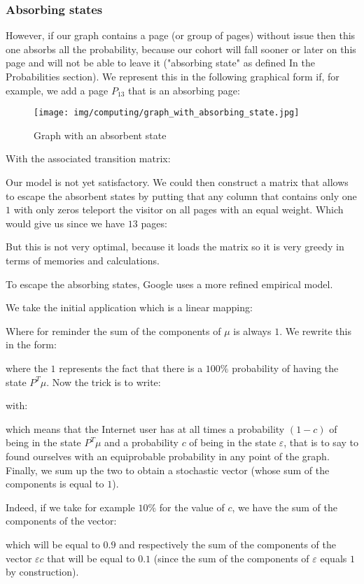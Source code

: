 	\subsubsection{Absorbing states}
	However, if our graph contains a page (or group of pages) without issue then this one absorbs all the probability, because our cohort will fall sooner or later on this page and will not be able to leave it ("absorbing state" as defined In the Probabilities section). We represent this in the following graphical form if, for example, we add a page $P_{13}$ that is an absorbing page:
	\begin{figure}[H]
		\centering
		\texttt{[image: img/computing/graph\_with\_absorbing\_state.jpg]}
		\caption{Graph with an absorbent state}
	\end{figure}
	With the associated transition matrix:
	\setcounter{MaxMatrixCols}{20}
	
	Our model is not yet satisfactory. We could then construct a matrix that allows to escape the absorbent states by putting that any column that contains only one $1$ with only zeros teleport the visitor on all pages with an equal weight. Which would give us since we have $13$ pages:
	\setcounter{MaxMatrixCols}{20}
	
	But this is not very optimal, because it loads the matrix so it is very greedy in terms of memories and calculations.

	To escape the absorbing states, Google uses a more refined empirical model.

	We take the initial application which is a linear mapping:
	
	Where for reminder the sum of the components of $\mu$ is always $1$. We rewrite this in the form:
	
	where the $1$ represents the fact that there is a $100\%$ probability of having the state $P^T\mu$. Now the trick is to write:
	
	with:
	
	which means that the Internet user has at all times a probability $(1-c)$ of being in the state $P^T\mu$ and a probability $c$ of being in the state $\varepsilon$, that is to say to found ourselves with an equiprobable probability in any point of the graph. Finally, we sum up the two to obtain a stochastic vector (whose sum of the components is equal to $1$).

	Indeed, if we take for example $10\%$ for the value of $c$, we have the sum of the components of the vector:
	
	which will be equal to $0.9$ and respectively the sum of the components of the vector $\varepsilon c$ that will be equal to $0.1$ (since the sum of the components of $\varepsilon$ equals $1$ by construction).
	
